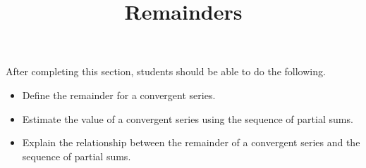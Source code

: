 \documentclass{ximera}
\title{Remainders}
\begin{document}
\begin{abstract}
\end{abstract}

\maketitle

\begin{sectionOutcomes}

After completing this section, students should be able to do the following.

\begin{itemize}
\item Define the remainder for a convergent series.
\item Estimate the value of a convergent series using the sequence of partial sums.
\item Explain the relationship between the remainder of a convergent series and the sequence of partial sums.
\end{itemize}

\end{sectionOutcomes}
\end{document}
